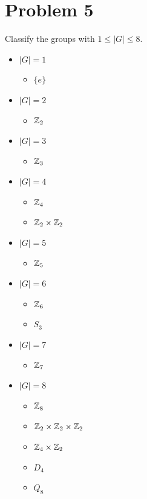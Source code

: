 \documentclass[a4paper,12pt]{extarticle}
\theoremstyle{definition}
\begin{document}
        \section*{Problem 5}
        Classify the groups with $1\leq|G|\leq8$.
        \begin{itemize}
            \item $|G|=1$\begin{itemize}
                \item $\{e\}$
            \end{itemize}
            \item $|G|=2$\begin{itemize}
                \item $\mathbb{Z}_2$
            \end{itemize}
            \item $|G|=3$\begin{itemize}
                \item $\mathbb{Z}_3$
            \end{itemize}
            \item $|G|=4$\begin{itemize}
                \item $\mathbb{Z}_4$
                \item $\mathbb{Z}_2\times\mathbb{Z}_2$
            \end{itemize}
            \item $|G|=5$\begin{itemize}
                \item $\mathbb{Z}_5$
            \end{itemize}
            \item $|G|=6$\begin{itemize}
                \item $\mathbb{Z}_6$
                \item $S_3$
            \end{itemize}
            \item $|G|=7$\begin{itemize}
                \item $\mathbb{Z}_7$
            \end{itemize}
            \item $|G|=8$\begin{itemize}
                \item $\mathbb{Z}_8$
                \item $\mathbb{Z}_2\times\mathbb{Z}_2\times\mathbb{Z}_2$
                \item $\mathbb{Z}_4\times\mathbb{Z}_2$
                \item $D_4$
                \item $Q_8$
            \end{itemize}
        \end{itemize}
\end{document}
